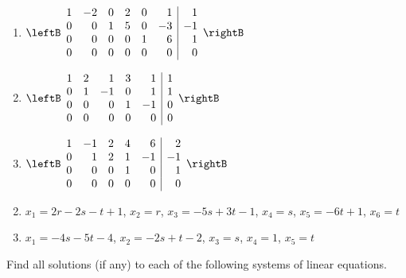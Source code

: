 \begin{multicols}{2}
\begin{ex}
\begin{enumerate}[label={\alph*.}]
\item 
$\leftB \begin{array}{rrrrrr|r}
	1 & -2 & 0 & 2 & 0 & 1 &  1 \\
	0 &  0 & 1 & 5 & 0 &-3 & -1 \\
	0 & 0 &  0 & 0 & 1 & 6 &  1 \\
	0 & 0 &  0 & 0 & 0 & 0 & 0
\end{array} \rightB$

\item 
$\leftB \begin{array}{rrrrr|r}
	1 & 2 & 1 & 3 & 1 & 1 \\
	0 & 1 &-1 & 0 & 1 & 1 \\
	0 & 0 & 0 & 1 & -1& 0 \\
	0 & 0 & 0 & 0 & 0 & 0
\end{array} \rightB$

\item 
$\leftB \begin{array}{rrrrr|r}
	1 & -1 & 2 & 4 & 6 &  2 \\
	0 &  1 & 2 & 1 & -1 & -1 \\
	0 &  0 & 0 & 1 & 0 & 1 \\
	0 &  0 & 0 & 0 & 0 & 0
\end{array} \rightB$

\end{enumerate}
\begin{sol}
\begin{enumerate}[label={\alph*.}]
\setcounter{enumi}{1}
\item  $x_1 = 2r - 2s - t + 1$, $x_2 = r$, $x_3 = -5s + 3t - 1$, $x_4 = s$, $x_5 = - 6t + 1$, $x_6 = t$

\setcounter{enumi}{3}
\item  $x_1 = - 4s - 5t - 4$, $x_2 = -2s + t - 2$, $x_3 = s$, $x_4 = 1$, $x_5 = t$

\end{enumerate}
\end{sol}
\end{ex}

\begin{ex}
Find all solutions (if any) to each of the following systems of linear equations.


\end{ex}
\end{multicols}
